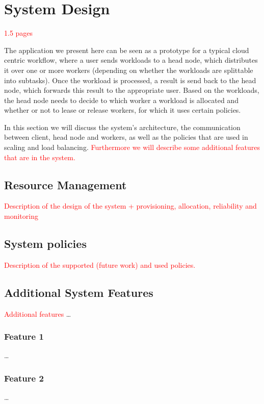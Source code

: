 \documentclass{stylesheet}
\begin{document}
\section{System Design}
\label{sec:design}
\textcolor{red}{1.5 pages}

The application we present here can be seen as a prototype for a typical cloud centric workflow, where a user sends workloads to a head node, which distributes it over one or more workers (depending on whether the workloads are splittable into subtasks). Once the workload is processed, a result is send back to the head node, which forwards this result to the appropriate user. Based on the workloads, the head node needs to decide to which worker a workload is allocated and whether or not to lease or release workers, for which it uses certain policies.

In this section we will discuss the system's architecture, the communication between client, head node and workers, as well as the policies that are used in scaling and load balancing. \textcolor{red}{Furthermore we will describe some additional features that are in the system.}

\subsection{Resource Management}
\label{subsec:resourceManagement}
\textcolor{red}{Description of the design of the system + provisioning, allocation, reliability and monitoring}

\subsection{System policies}
\label{subsec:policies}
\textcolor{red}{Description of the supported (future work) and used policies.}

\subsection{Additional System Features}
\label{subsec:additionalFeatures}
\textcolor{red}{Additional features}
\ldots
\subsubsection{Feature 1}
\ldots
\subsubsection{Feature 2}
\ldots
\end{document}
